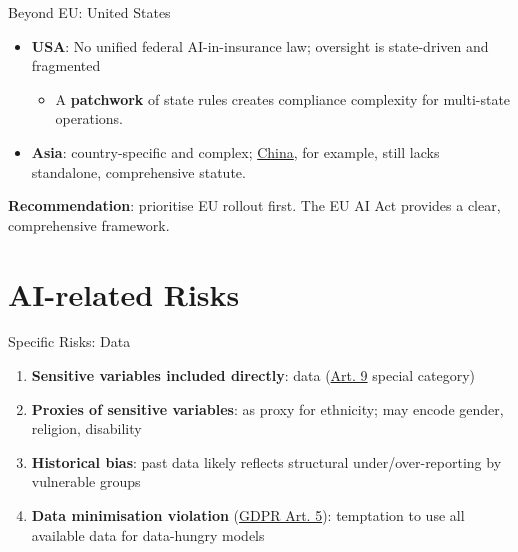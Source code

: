 \documentclass[
  ignorenonframetext,
]{beamer}
\providecommand{\tightlist}{%
  \setlength{\itemsep}{0pt}\setlength{\parskip}{0pt}}
\begin{document}
\begin{frame}{Beyond EU: United States}
\label{beyond-eu-united-states}
\begin{itemize}
\tightlist
\item
  \textbf{USA}: No unified federal AI-in-insurance law; oversight is
  state-driven and fragmented

  \begin{itemize}
  \tightlist
  \item
    A \textbf{patchwork} of state rules creates compliance complexity
    for multi-state operations.
  \end{itemize}
\item
  \textbf{Asia}: country-specific and complex;
  \href{https://cms.law/en/int/expert-guides/ai-regulation-scanner/china}{China},
  for example, still lacks standalone, comprehensive statute.
\end{itemize}

\begin{tcolorbox}[enhanced jigsaw, coltitle=black, opacityback=0, toprule=.15mm, breakable, left=2mm, rightrule=.15mm, titlerule=0mm, colframe=quarto-callout-tip-color-frame, opacitybacktitle=0.6, bottomtitle=1mm, toptitle=1mm, bottomrule=.15mm, title=\textcolor{quarto-callout-tip-color}{\faLightbulb}\hspace{0.5em}{Tip}, arc=.35mm, leftrule=.75mm, colback=white, colbacktitle=quarto-callout-tip-color!10!white]

\textbf{Recommendation}: prioritise EU rollout first. The EU AI Act
provides a clear, comprehensive framework.

\end{tcolorbox}
\end{frame}

\section{AI-related Risks}\label{ai-related-risks}

\begin{frame}{Specific Risks: Data}
\label{specific-risks-data}
\begin{enumerate}
\tightlist
\item
  \textbf{Sensitive variables included directly}: 
  data (\href{https://gdpr-info.eu/art-9-gdpr/}{Art. 9} special
  category)
\item
  \textbf{Proxies of sensitive variables}:  as proxy for
  ethnicity;  may encode gender, religion, disability
\item
  \textbf{Historical bias}: past  data likely reflects
  structural under/over-reporting by vulnerable groups
\item
  \textbf{Data minimisation violation}
  (\href{https://gdpr-info.eu/art-5-gdpr/}{GDPR Art. 5}): temptation to
  use all available data for data-hungry models
\end{enumerate}
\end{frame}
\end{document}
